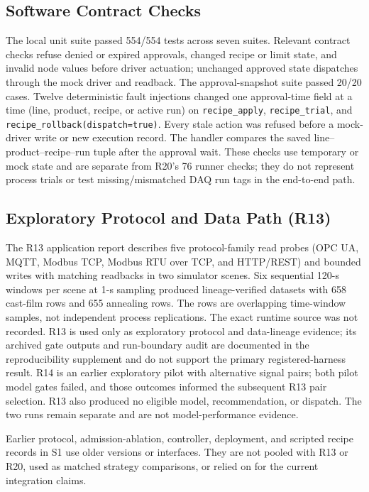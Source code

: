 \subsection{Software Contract Checks}
The local unit suite passed 554/554 tests across seven suites. Relevant
contract checks refuse denied or expired approvals, changed recipe or limit
state, and invalid node values before driver actuation; unchanged approved
state dispatches through the mock driver and readback. The approval-snapshot
suite passed 20/20 cases. Twelve deterministic fault injections changed one
approval-time field at a time (line, product, recipe, or active run) on
\texttt{recipe\_apply}, \texttt{recipe\_trial}, and
\texttt{recipe\_rollback(dispatch=true)}. Every stale action was refused
before a mock-driver write or new execution record. The handler compares the
saved line--product--recipe--run tuple after the approval wait. These checks
use temporary or mock state and are separate from R20's 76 runner checks;
they do not represent process trials or test missing/mismatched DAQ run tags
in the end-to-end path.

\subsection{Exploratory Protocol and Data Path (R13)}
\label{sec:crossscene}
The R13 application report describes five protocol-family read probes (OPC UA,
MQTT, Modbus TCP, Modbus RTU over TCP, and HTTP/REST) and bounded writes with
matching readbacks in two simulator scenes. Six sequential 120-s windows per
scene at 1-s sampling produced lineage-verified datasets with 658 cast-film
rows and 655 annealing rows. The rows are overlapping time-window samples, not
independent process replications. The exact runtime source was not recorded. R13 is
used only as exploratory protocol and data-lineage evidence; its archived gate
outputs and run-boundary audit are documented in the reproducibility
supplement and do not support the primary registered-harness result.
R14 is an earlier exploratory pilot with alternative signal pairs; both pilot
model gates failed, and those outcomes informed the subsequent R13 pair
selection. R13 also produced no eligible model, recommendation, or dispatch.
The two runs remain separate and are not model-performance evidence.

Earlier protocol, admission-ablation, controller, deployment, and scripted
recipe records in S1 use older versions or interfaces. They are not pooled
with R13 or R20, used as matched strategy comparisons, or relied on for the
current integration claims.
